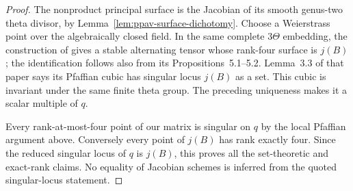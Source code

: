 \begin{proof}
The nonproduct principal surface is the Jacobian of its smooth
genus-two theta divisor, by
Lemma~\ref{lem:ppav-surface-dichotomy}. Choose a Weierstrass point
over the algebraically closed field. In the same complete
$3\Theta$ embedding, the construction of
\citet[Section~4, Lemmas~4.1--4.4 and Proposition~4.5(a)]
{RainsSam2018Trivectors} gives a stable alternating tensor whose
rank-four surface is $j(B)$; the identification follows also from
its Propositions~5.1--5.2. Lemma~3.3 of that paper says its Pfaffian
cubic has singular locus $j(B)$ as a set. This cubic is invariant
under the same finite theta group. The preceding uniqueness makes
it a scalar multiple of $q$.

Every rank-at-most-four point of our matrix is singular on $q$ by
the local Pfaffian argument above. Conversely every point of
$j(B)$ has rank exactly four. Since the reduced singular locus
of $q$ is $j(B)$, this proves all the set-theoretic and exact-rank
claims. No equality of Jacobian schemes is inferred from the
quoted singular-locus statement.
\end{proof}

